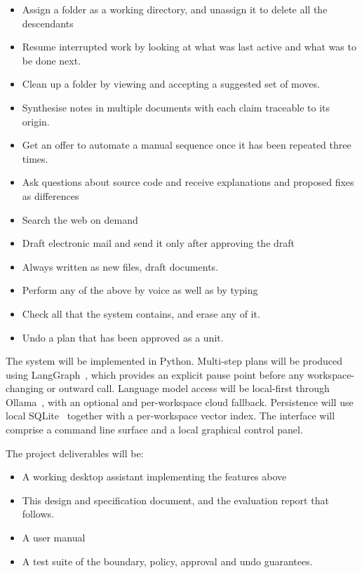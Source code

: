 \documentclass{FastFyp}
\begin{document}
\begin{itemize}
    \item Assign a folder as a working directory, and unassign it to delete all the descendants
    \item Resume interrupted work by looking at what was last active and what was to be done next.
    \item Clean up a folder by viewing and accepting a suggested set of moves.
    \item Synthesise notes in multiple documents with each claim traceable to its origin.
    \item Get an offer to automate a manual sequence once it has been repeated three times.
    \item Ask questions about source code and receive explanations and proposed fixes as differences
    \item Search the web on demand
    \item Draft electronic mail and send it only after approving the draft
    \item Always written as new files, draft documents.
    \item Perform any of the above by voice as well as by typing
    \item Check all that the system contains, and erase any of it.
    \item Undo a plan that has been approved as a unit.
\end{itemize}

The system will be implemented in Python. Multi-step plans will be produced using LangGraph~\cite{ref:langgraph}, which provides an explicit pause point before any workspace-changing or outward call. Language model access will be local-first through Ollama~\cite{ref:ollama}, with an optional and per-workspace cloud fallback. Persistence will use local SQLite~\cite{ref:sqlite} together with a per-workspace vector index. The interface will comprise a command line surface and a local graphical control panel.

The project deliverables will be:

\begin{itemize}
    \item A working desktop assistant implementing the features above
    \item This design and specification document, and the evaluation report that follows.
    \item A user manual
    \item A test suite of the boundary, policy, approval and undo guarantees.
\end{itemize}
\end{document}
